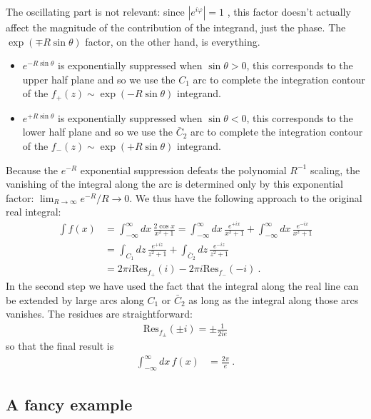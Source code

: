 The oscillating part is not relevant: since $|e^{i\varphi}| = 1$ , this factor doesn't actually affect the magnitude of the contribution of the integrand, just the phase. The $\exp(\mp R\sin\theta)$ factor, on the other hand, is everything. 
\begin{itemize}
	\item $e^{- R\sin\theta}$ is exponentially suppressed when $\sin\theta > 0$, this corresponds to the upper half plane and so we use the $C_1$ arc to complete the integration contour of the $f_+(z)\sim \exp(-R\sin\theta)$ integrand.
	\item $e^{+ R\sin\theta}$ is exponentially suppressed when $\sin\theta < 0$, this corresponds to the lower half plane and so we use the $\bar C_2$ arc to complete the integration contour of the $f_-(z)\sim \exp(+R\sin\theta)$ integrand.
\end{itemize}
Because the $e^{-R}$ exponential suppression defeats the polynomial $R^{-1}$ scaling, the vanishing of the integral along the arc is determined only by this exponential factor: $\lim_{R\to\infty}e^{-R}/R\to 0$. We thus have the following approach to the original real integral:
\begin{align}
	\int f(x) &= \int_{-\infty}^\infty  dx\,
\frac{2\cos x}{x^2+1} 
	= 
	\int_{-\infty}^\infty  dx\,
	\frac{e^{+ix}}{x^2+1} 
	+
	\int_{-\infty}^\infty  dx\,
	\frac{e^{-ix}}{x^2+1} 
	\\ 
	&=
	\int_{C_1} dz\, 
	\frac{e^{+iz}}{z^2+1} 
	+
	\int_{\bar C_2} dz\, 
	\frac{e^{-iz}}{z^2+1} 
	\\
	&=
	2\pi i \text{Res}_{f_+}(i)
	-
	2\pi i \text{Res}_{f_-}(-i)
\ .
\end{align}
In the second step we have used the fact that the integral along the real line can be extended by large arcs along $C_1$ or $\bar C_2$ as long as the integral along those arcs vanishes. The residues are straightforward: 
\begin{align}
	\text{Res}_{f_\pm}(\pm i) = \pm \frac{1}{2ie}
\end{align}
so that the final result is
\begin{align}
	\int_{-\infty}^\infty dx\, f(x) &= \frac{2\pi}{e} \ .
\end{align}


 \subsection{A fancy example}


